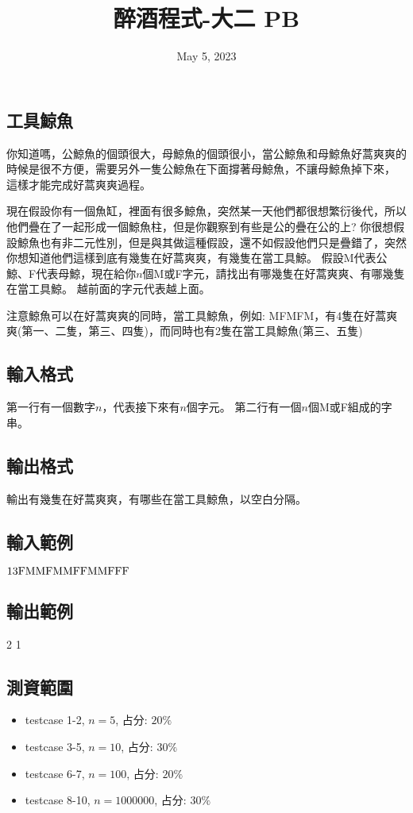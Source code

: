 \documentclass{article}
\title{醉酒程式-大二 PB}
\date{May 5, 2023}
\begin{document}
\begin{CJK*}{UTF8}{bsmi}

\maketitle

\section*{工具鯨魚}

你知道嗎，公鯨魚的個頭很大，母鯨魚的個頭很小，當公鯨魚和母鯨魚好蒿爽爽的時候是很不方便，需要另外一隻公鯨魚在下面撐著母鯨魚，不讓母鯨魚掉下來，
這樣才能完成好蒿爽爽過程。

現在假設你有一個魚缸，裡面有很多鯨魚，突然某一天他們都很想繁衍後代，所以他們疊在了一起形成一個鯨魚柱，但是你觀察到有些是公的疊在公的上?
你很想假設鯨魚也有非二元性別，但是與其做這種假設，還不如假設他們只是疊錯了，突然你想知道他們這樣到底有幾隻在好蒿爽爽，有幾隻在當工具鯨。
假設M代表公鯨、F代表母鯨，現在給你$n$個M或F字元，請找出有哪幾隻在好蒿爽爽、有哪幾隻在當工具鯨。
越前面的字元代表越上面。

注意鯨魚可以在好蒿爽爽的同時，當工具鯨魚，例如: MFMFM，有4隻在好蒿爽爽(第一、二隻，第三、四隻)，而同時也有2隻在當工具鯨魚(第三、五隻)

\subsection*{輸入格式}
第一行有一個數字$n$，代表接下來有$n$個字元。
第二行有一個$n$個M或F組成的字串。

\subsection*{輸出格式}
輸出有幾隻在好蒿爽爽，有哪些在當工具鯨魚，以空白分隔。

\subsection*{輸入範例}
$13\\\text{FMMFMMFFMMFFF}$

\subsection*{輸出範例}
2 1

\subsection*{測資範圍}
\begin{itemize}
    \item testcase 1-2, $n=5$, 占分: $20\%$
    \item testcase 3-5, $n=10$, 占分: $30\%$
    \item testcase 6-7, $n=100$, 占分: $20\%$
    \item testcase 8-10, $n=1000000$, 占分: $30\%$
\end{itemize}

\end{CJK*}
\end{document}
